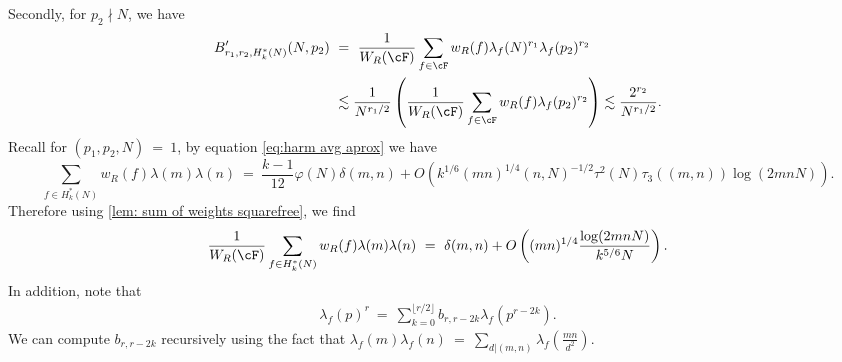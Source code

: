 \documentclass[11pt, reqno]{amsart}
\theoremstyle{definition}
\theoremstyle{remark}
\numberwithin{equation}{section}
\begin{document}
Secondly, for $p_2 \nmid N$, we have 
\begin{align}
     B'_{r_1,r_2,H_k^*(N)}(N,p_2) \ &=\ \frac{1}{W_R(\cF)}\sum_{f\in \cF} w_R(f) \lambda_f(N)^{r_1}\lambda_f(p_2)^{r_2} \notag\\ &\lesssim \frac{1}{N^{r_1/2}}\left(\frac{1}{W_R(\cF)}\sum_{f\in \cF} w_R(f) \lambda_f(p_2)^{r_2}\right) \lesssim \frac{2^{r_2}}{N^{r_1/2}}.
\end{align} 
Recall for $(p_1,p_2,N) \ =\ 1$, by equation \ref{eq:harm avg aprox} we have 
$$ \sum_{f\in H_k^*(N)} w_R(f) \lambda(m)\lambda(n)\ =\  \frac{k-1}{12} \varphi(N) \delta(m, n)  +O\left(k^{1 / 6}(m n)^{1 / 4}(n, N)^{-1 / 2} \tau^2(N) \tau_3((m, n)) \log (2 m n N)\right).$$ 
Therefore using \eqref{lem: sum of weights squarefree}, we find
\begin{equation} \label{eq: average two hecke}
    \frac{1}{W_R(\cF)}\sum_{f\in H_k^*(N)} w_R(f) \lambda(m)\lambda(n) \ = \ \delta(m,n) + O\left((mn)^{1/4}\frac{\log(2mnN)}{k^{5/6}N}\right).
\end{equation}
In addition, note that \begin{align} \label{eq: p not dividing N, hecke eigenvalue val}   \lambda_f(p)^r\ =\ \sum_{k=0}^{\lfloor r/ 2\rfloor} b_{r, r-2 k} \lambda_f\left(p^{r-2 k}\right). 
\end{align}We can compute $b_{r,r-2k}$ recursively using the fact that $\lambda_f(m)\lambda_f(n) \ =\ \sum_{d|(m,n)}\lambda_f\left(\frac{mn}{d^2}\right)$.
\end{document}
